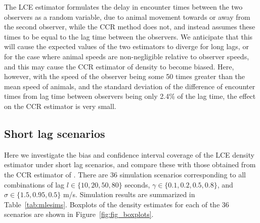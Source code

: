 \documentclass[useAMS, usenatbib, referee]{biom}\usepackage[]{graphicx}\usepackage[]{color}
\begin{document}
The LCE estimator formulates the delay in encounter times between the two observers as a random variable, due to animal movement towards or away from the second observer, while the CCR method does not, and instead assumes these times to be equal to the lag time between the observers. We anticipate that this will cause the expected values of the two estimators to diverge for long lags, or for the case where animal speeds are non-negligible relative to observer speeds, and this may cause the CCR estimator of density to become biased. Here, however, with the speed of the observer being some 50 times greater than the mean speed of animals, and the standard deviation of the difference of encounter times from lag time between observers being only 2.4\% of the lag time, the effect on the CCR estimator is very small.

\subsection{Short lag scenarios}

Here we investigate the bias and confidence interval coverage of the LCE density estimator under short lag scenarios, and compare these with those obtained from the CCR estimator of \cite{Stevenson+al:18}. There are 36 simulation scenarios corresponding to all combinations of lag $l \in \{ 10, 20, 50, 80\}$ seconds,  $\gamma \in\{ 0.1, 0.2, 0.5, 0.8\}$, and $\sigma\in\{ 1.5, 0.95, 0.5\}$ m/s. Simulation results are summarized in Table~\ref{tab:mlesims}. Boxplots of the density estimates for each of the 36 scenarios are shown in Figure~\ref{fig:fig_boxplots}.

\end{document}
